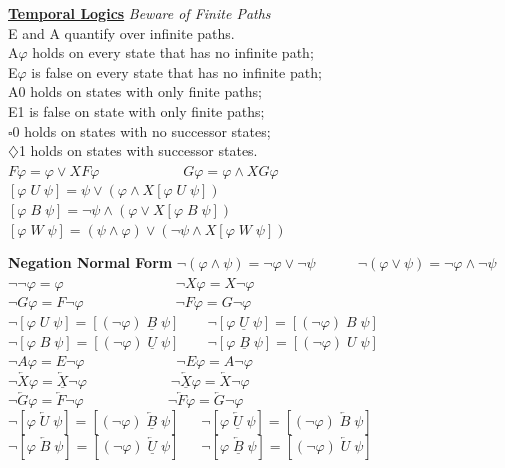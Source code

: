 \documentclass{article}
\begin{document}
\begin{multicols}{4}
\textbf{\underline{Temporal Logics}}
\textit{Beware of Finite Paths}\\
E and A quantify over infinite paths.\\
A$\varphi$ holds on every state that has no infinite path;\\
E$\varphi$ is false on every state that has no infinite path;\\
A0 holds on states with only finite paths;\\
E1 is false on state with only finite paths;\\
$\square$0 holds on states with no successor states;\\
$\diamondsuit$1 holds on states with successor states.\\
$F\varphi = \varphi \vee X F\varphi\qquad\qquad\qquad G\varphi = \varphi \wedge XG \varphi$\\
$[ \varphi \; U\; \psi ] = \psi \vee (\varphi\wedge X[ \varphi \; U\; \psi])$\\
$[ \varphi \; B\; \psi ] = \neg \psi \wedge (\varphi \vee X[ \varphi \; B\; \psi])$\\
$[ \varphi \; W\; \psi] = (\psi \wedge \varphi) \vee (\neg \psi \wedge X[\varphi \; W \; \psi])$

\textbf{Negation Normal Form}
${\neg( \varphi \wedge \psi ) = \neg \varphi \vee \neg \psi} \qquad\quad {\neg( \varphi \vee \psi ) = \neg \varphi \wedge \neg \psi }$ \\
${\neg \neg \varphi = \varphi} \qquad\qquad\qquad\qquad  {\neg X \varphi = X \neg \varphi}$ \\
${\neg G \varphi = F \neg \varphi}\qquad\qquad\qquad\;\;{\neg F \varphi = G \neg \varphi}$\\
${\neg[\varphi \; U \;\psi] = [ (\neg \varphi) \;\underline{B}\; \psi ]}\qquad  {\neg[\varphi\; \underline{U}\; \psi] = [ (\neg \varphi)\; B \;\psi ]}$\\
${\neg[\varphi \; B \;\psi] = [ (\neg \varphi) \;\underline{U}\; \psi ]}\qquad  {\neg[\varphi\; \underline{B}\; \psi] = [ (\neg \varphi)\; U\; \psi ]}$\\
${\neg A \varphi = E \neg \varphi} \qquad\qquad\qquad\;\;  {\neg E \varphi = A \neg \varphi}$ \\
${\neg \overleftarrow{X} \varphi = \underline{\overleftarrow{X}} \neg \varphi } \qquad\qquad\qquad  {\neg \underline{\overleftarrow{X}} \varphi = \overleftarrow{X} \neg \varphi }$\\
${\neg \overleftarrow{G} \varphi = \overleftarrow{F} \neg \varphi } \qquad\qquad\qquad {\neg \overleftarrow{F} \varphi = \overleftarrow{G} \neg \varphi }$\\
${\neg[\varphi \;\overleftarrow{U} \;\psi] = [ (\neg \varphi) \;\overleftarrow{\underline{B}}\; \psi ]}\quad\;\; {\neg[\varphi\; \overleftarrow{\underline{U}}\; \psi] = [ (\neg \varphi)\; \overleftarrow{B} \; \psi ]}$\\
${\neg[\varphi \;\overleftarrow{B} \;\psi] = [ (\neg \varphi) \;\overleftarrow{\underline{U}}\; \psi ]}\quad\;\; {\neg[\varphi\; \overleftarrow{\underline{B}}\; \psi] = [ (\neg \varphi)\; \overleftarrow{U} \; \psi ]}$\\


\end{multicols}
\end{document}
